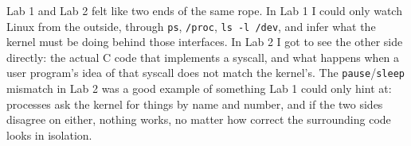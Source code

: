 \documentclass[12pt,a4paper]{article}
\begin{document}
\hspace{0.8cm} Lab 1 and Lab 2 felt like two ends of the same rope. In Lab 1 I
could only watch Linux from the outside, through \texttt{ps}, \texttt{/proc},
\texttt{ls -l /dev}, and infer what the kernel must be doing behind those
interfaces. In Lab 2 I got to see the other side directly: the actual C code
that implements a syscall, and what happens when a user program's idea of that
syscall does not match the kernel's. The \texttt{pause}/\texttt{sleep}
mismatch in Lab 2 was a good example of something Lab 1 could only hint at:
processes ask the kernel for things by name and number, and if the two sides
disagree on either, nothing works, no matter how correct the surrounding code
looks in isolation.
\end{document}

